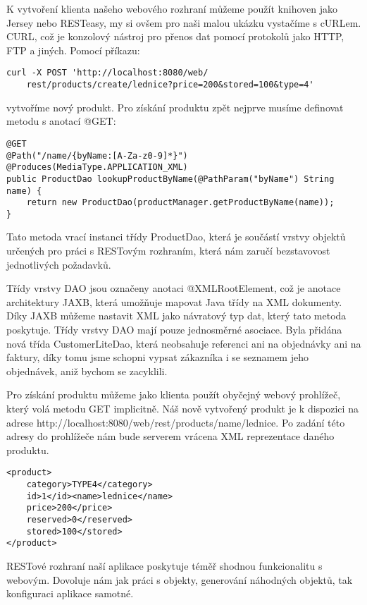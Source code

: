 \documentclass[122pt,oneside]{fithesis}
\begin{document}
K vytvoření klienta našeho webového rozhraní můžeme použít knihoven jako Jersey nebo RESTeasy, my si ovšem pro naši malou ukázku vystačíme s cURLem. CURL, což je konzolový nástroj pro přenos dat pomocí protokolů jako HTTP, FTP a jiných. Pomocí příkazu:

\begin{lstlisting}
curl -X POST 'http://localhost:8080/web/
	rest/products/create/lednice?price=200&stored=100&type=4'
\end{lstlisting}

vytvoříme nový produkt. Pro získání produktu zpět nejprve musíme definovat metodu s anotací @GET:

\begin{lstlisting}
@GET
@Path("/name/{byName:[A-Za-z0-9]*}")
@Produces(MediaType.APPLICATION_XML)
public ProductDao lookupProductByName(@PathParam("byName") String name) {
	return new ProductDao(productManager.getProductByName(name));
}
\end{lstlisting}

Tato metoda vrací instanci třídy ProductDao, která je součástí vrstvy objektů určených pro práci s RESTovým rozhraním, která nám zaručí bezstavovost jednotlivých požadavků. 

Třídy vrstvy DAO jsou označeny anotaci @XMLRootElement, což je anotace architektury JAXB, která umožňuje mapovat Java třídy na XML dokumenty. Díky JAXB můžeme nastavit XML jako návratový typ dat, který tato metoda poskytuje. Třídy vrstvy DAO mají pouze jednosměrné asociace. Byla přidána nová třída CustomerLiteDao, která neobsahuje referenci ani na objednávky ani na faktury, díky tomu jsme schopni vypsat zákazníka i se seznamem jeho objednávek, aniž bychom se zacyklili.

Pro získání produktu můžeme jako klienta použít obyčejný webový prohlížeč, který volá metodu GET implicitně. Náš nově vytvořený produkt je k dispozici na adrese http://localhost:8080/web/rest/products/name/lednice.
Po zadání této adresy do prohlížeče nám bude serverem vrácena XML reprezentace daného produktu.

\begin{lstlisting}
<product>
	category>TYPE4</category>
	id>1</id><name>lednice</name>
	price>200</price>
	reserved>0</reserved>
	stored>100</stored>
</product>
\end{lstlisting}

RESTové rozhraní naší aplikace poskytuje téměř shodnou funkcionalitu s webovým. Dovoluje nám jak práci s objekty, generování náhodných objektů, tak konfiguraci aplikace samotné.
\end{document}
